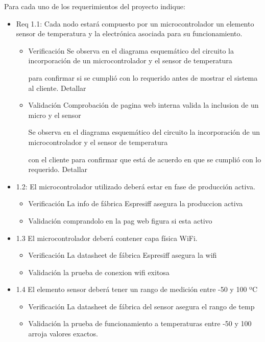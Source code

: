 \documentclass[11pt]{charter}
\begin{document}
Para cada uno de los requerimientos del proyecto indique:
\begin{itemize} 
\item Req 1.1: Cada nodo estará compuesto por un microcontrolador un elemento sensor de
temperatura y la electrónica asociada para su funcionamiento.
	\begin{itemize}
	\item Verificación Se observa en el diagrama esquemático del circuito la incorporación de un microcontrolador y el sensor de temperatura
	
	 para confirmar si se cumplió con lo requerido antes de mostrar el sistema al cliente. Detallar 
	\item Validación Comprobación de pagina web interna valida la inclusion de un micro y el sensor
	
	Se observa en el diagrama esquemático del circuito la incorporación de un microcontrolador y el sensor de temperatura

con el cliente para confirmar que está de acuerdo en que se cumplió con lo requerido. Detallar  
\end{itemize}

\item 1.2: El microcontrolador utilizado deberá estar en fase de producción activa.


\begin{itemize}
\item Verificación La info de fábrica Espresiff asegura la produccion activa
\item Validación comprandolo en la pag web figura si esta activo
\end{itemize}

\item 1.3 El microcontrolador deberá contener capa física WiFi.

\begin{itemize}
\item Verificación La datasheet de fábrica Espresiff asegura la wifi
\item Validación la prueba de conexion wifi exitosa
\end{itemize}



\item 1.4 El elemento sensor deberá tener un rango de medición entre -50 y 100 ºC
\begin{itemize}
\item Verificación La datasheet de fábrica del sensor asegura el rango de temp
\item Validación la prueba de funcionamiento a temperaturas entre -50 y 100 arroja valores exactos.
\end{itemize}



\end{itemize}
\end{document}

